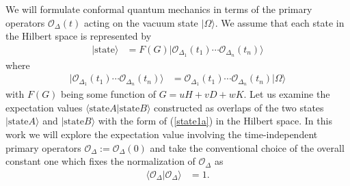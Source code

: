 \documentclass[12pt]{article}
\numberwithin{equation}{section}
\begin{document}
We will formulate conformal quantum mechanics 
in terms of the primary operators $\mathcal{O}_{\Delta}(t)$ 
acting on the vacuum state $|\Omega\rangle$. 
We assume that each state in the Hilbert space 
is represented by 
\begin{align}
\label{state1a}
|\mathrm{state}\rangle 
&=
F(G)|\mathcal{O}_{\Delta_{1}}(t_{1})\cdots\mathcal{O}_{\Delta_{n}}(t_{n})\rangle
\end{align}
where
\begin{align}
\label{state1b}
|\mathcal{O}_{\Delta_{1}}(t_{1})\cdots\mathcal{O}_{\Delta_{n}}(t_{n})\rangle
&=\mathcal{O}_{\Delta_{1}}(t_{1})\cdots\mathcal{O}_{\Delta_{n}}(t_{n})|\Omega\rangle
\end{align}
with $F(G)$ being some function of $G=uH+vD+wK$. 
Let us examine the expectation values 
$\langle \mathrm{state} A|\mathrm{state} B\rangle$ 
constructed as overlaps 
of the two states $|\mathrm{state} A\rangle$ 
and $|\mathrm{state} B\rangle$ 
with the form of (\ref{state1a}) in the Hilbert space. 
In this work we will explore the expectation value involving the time-independent primary operators 
$\mathcal{O}_{\Delta}:=\mathcal{O}_{\Delta}(0)$ 
and take the conventional choice of the overall constant one which 
fixes the normalization of $\mathcal{O}_{\Delta}$ as
\begin{align}
\label{state2a}
\langle \mathcal{O}_{\Delta}|\mathcal{O}_{\Delta}\rangle &=1. 
\end{align}
\end{document}
